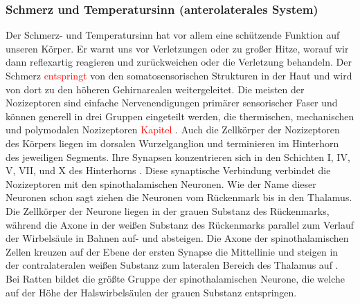\documentclass[12pt,a4paper,pdftex]{article}
\begin{document}
\subsubsection{Schmerz und Temperatursinn (anterolaterales System)}
Der Schmerz- und Temperatursinn hat vor allem eine schützende Funktion auf unseren Körper. Er warnt uns vor Verletzungen oder zu großer Hitze, worauf wir dann reflexartig reagieren und zurückweichen oder die Verletzung behandeln. Der Schmerz \textcolor{red}{entspringt} von den somatosensorischen Strukturen in der Haut und wird von dort zu den höheren Gehirnarealen weitergeleitet. 
Die meisten der Nozizeptoren sind einfache Nervenendigungen primärer sensorischer Faser und können generell in drei Gruppen eingeteilt werden, die thermischen, mechanischen und polymodalen Nozizeptoren \textcolor{red}{Kapitel} \citep{kandel2013principles}. Auch die Zellkörper der Nozizeptoren des Körpers liegen im dorsalen Wurzelganglion und terminieren im Hinterhorn des jeweiligen Segments.  Ihre Synapsen konzentrieren sich in den Schichten I, IV, V, VII, und X des Hinterhorns \cite[Kap.~25]{paxinos2014rat}.
Diese synaptische Verbindung verbindet die Nozizeptoren mit den spinothalamischen Neuronen. Wie der Name dieser Neuronen schon sagt ziehen die Neuronen vom Rückenmark bis in den Thalamus. Die Zellkörper der Neurone liegen in der grauen Substanz des Rückenmarks, während die Axone in der weißen Substanz des Rückenmarks parallel zum Verlauf der Wirbelsäule in Bahnen auf- und absteigen. Die Axone der spinothalamischen Zellen kreuzen auf der Ebene der ersten Synapse die Mittellinie und steigen in der contralateralen weißen Substanz zum lateralen Bereich des Thalamus auf \cite[Kap.~25]{paxinos2014rat}. Bei Ratten bildet die größte Gruppe der spinothalamischen Neurone, die welche auf der Höhe der Halswirbelsäulen der grauen Substanz entspringen.

    
    
\end{document}
